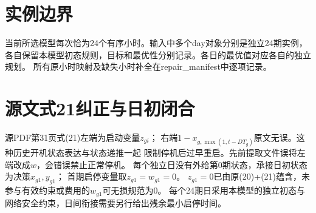 \documentclass[11pt]{ctexart}
\begin{document}
\section*{实例边界}
当前所选模型每次恰为24个有序小时。输入中多个day对象分别是独立24期实例，
各自保留本模型初态规则，目标和最优性分别记录。各日的最优值对应各自的独立规划。
所有原小时映射及缺失小时补全在repair\_manifest中逐项记录。



\section*{源文式21纠正与日初闭合}
源PDF第31页式(21)左端为启动变量$z_{gi}$；
右端$1-x_{g,\max(1,t-DT_g)}$原文无误。这种历史开机状态表达与状态递推一起
限制停机后过早重启。先前提取文件误将左端改成$w$，会错误禁止正常停机。
每个独立日没有外给第0期状态，承接日初状态为决策$x_{g1},y_{g1}$；
首期启停变量取$z_{g1}=w_{g1}=0$。
$z_{g1}=0$已由原(20)+(21)蕴含，未参与有效约束或费用的$w_{g1}$可无损规范为0。
每个24期日采用本模型的独立初态与网络安全约束，日间衔接需要另行给出残余最小启停时间。
\end{document}
